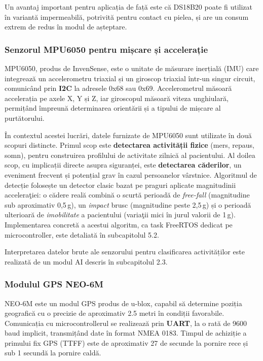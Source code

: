 \documentclass[12pt,a4paper]{article}
\begin{document}
Un avantaj important pentru aplicația de față este că DS18B20 poate fi utilizat în variantă impermeabilă, potrivită pentru contact cu pielea, și are un consum extrem de redus în modul de așteptare.

\subsubsection{Senzorul MPU6050 pentru mișcare și accelerație}

MPU6050, produs de InvenSense, este o unitate de măsurare inerțială (IMU) care integrează un accelerometru triaxial și un giroscop triaxial într-un singur circuit, comunicând prin \textbf{I2C} la adresele 0x68 sau 0x69. Accelerometrul măsoară accelerația pe axele X, Y și Z, iar giroscopul măsoară viteza unghiulară, permițând împreună determinarea orientării și a tipului de mișcare al purtătorului.

În contextul acestei lucrări, datele furnizate de MPU6050 sunt utilizate în două scopuri distincte. Primul scop este \textbf{detectarea activității fizice} (mers, repaus, somn), pentru construirea profilului de activitate zilnică al pacientului. Al doilea scop, cu implicații directe asupra siguranței, este \textbf{detectarea căderilor}, un eveniment frecvent și potențial grav în cazul persoanelor vârstnice. Algoritmul de detecție folosește un detector clasic bazat pe praguri aplicate magnitudinii acceleraţiei: o cădere reală combină o scurtă perioadă de \textit{free-fall} (magnitudine sub aproximativ 0,5\,g), un \textit{impact} brusc (magnitudine peste 2,5\,g) și o perioadă ulterioară de \textit{imobilitate} a pacientului (variaţii mici în jurul valorii de 1\,g). Implementarea concretă a acestui algoritm, ca task FreeRTOS dedicat pe microcontroller, este detaliată în subcapitolul 5.2.

Interpretarea datelor brute ale senzorului pentru clasificarea activităților este realizată de un modul AI descris în subcapitolul 2.3.

\subsubsection{Modulul GPS NEO-6M}

NEO-6M este un modul GPS produs de u-blox, capabil să determine poziția geografică cu o precizie de aproximativ 2.5 metri în condiții favorabile. Comunicația cu microcontrollerul se realizează prin \textbf{UART}, la o rată de 9600 baud implicit, transmițând date în format NMEA 0183. Timpul de achiziție a primului fix GPS (TTFF) este de aproximativ 27 de secunde la pornire rece și sub 1 secundă la pornire caldă.
\end{document}
